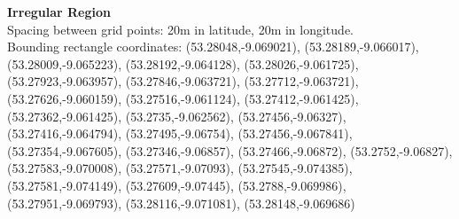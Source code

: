 \textbf{Irregular Region}
\\Spacing between grid points: 20m in latitude, 20m in longitude.
\\Bounding rectangle coordinates: (53.28048,-9.069021), (53.28189,-9.066017), (53.28009,-9.065223), (53.28192,-9.064128), (53.28026,-9.061725), (53.27923,-9.063957), (53.27846,-9.063721), (53.27712,-9.063721), (53.27626,-9.060159), (53.27516,-9.061124), (53.27412,-9.061425), (53.27362,-9.061425), (53.2735,-9.062562), (53.27456,-9.06327), (53.27416,-9.064794), (53.27495,-9.06754), (53.27456,-9.067841), (53.27354,-9.067605), (53.27346,-9.06857), (53.27466,-9.06872), (53.2752,-9.06827), (53.27583,-9.070008), (53.27571,-9.07093), (53.27545,-9.074385), (53.27581,-9.074149), (53.27609,-9.07445), (53.2788,-9.069986), (53.27951,-9.069793), (53.28116,-9.071081), (53.28148,-9.069686)
\\
